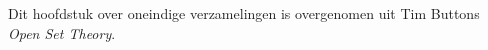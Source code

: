 \documentclass[../../../include/open-logic-chapter]{subfiles}
\begin{document}

\begin{editorial}
Dit hoofdstuk over oneindige verzamelingen is overgenomen uit Tim Buttons
\emph{Open Set Theory}.
\end{editorial}

\end{document}
